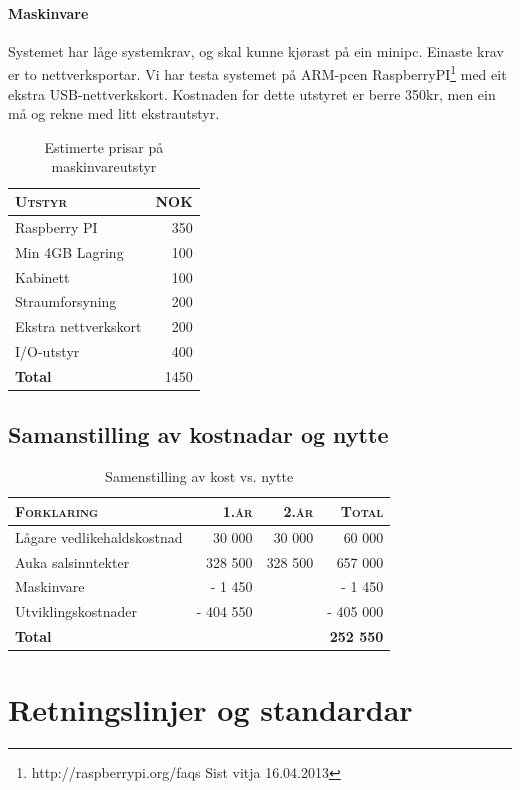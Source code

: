 \documentclass[nynorsk,12pt,a4paper]{article}
\begin{document}
\paragraph{Maskinvare}
Systemet har låge systemkrav, og skal kunne kjørast på ein minipc. Einaste krav er to nettverksportar. Vi har testa systemet på ARM-pcen RaspberryPI\footnote{ http://raspberrypi.org/faqs Sist vitja 16.04.2013} med eit ekstra USB-nettverkskort. Kostnaden for dette utstyret er berre 350kr, men ein må og rekne med litt ekstrautstyr.
\begin{table}[h!]
	\centering
	\begin{tabular}{l r}
	\textsc{Utstyr} & 	\textsc{NOK} \\ \hline
	Raspberry PI	& 	350 \\
	Min 4GB Lagring	&	100	\\
	Kabinett		&	100	\\
	Straumforsyning	&	200	\\
	Ekstra nettverkskort & 	200 \\
	I/O-utstyr		&	400	\\ \hline
	\textbf{Total}	&	1450 \\ \hline \hline
	\end{tabular}
	\caption{Estimerte prisar på maskinvareutstyr}
\end{table}


\subsection{Samanstilling av kostnadar og nytte}
\begin{table}[h!]
	\centering
	\begin{tabular}{l r r r}
	\textsc{Forklaring} & \textsc{1.år} & \textsc{2.år} & \textsc{Total} \\ \hline
	Lågare vedlikehaldskostnad & 30 000 & 30 000 & 60 000 \\
	Auka salsinntekter & 328 500 & 328 500 & 657 000 \\
	Maskinvare & - 1 450 & ~ & - 1 450 \\
	Utviklingskostnader & - 404 550 & ~ & - 405 000 \\ \hline
	\textbf{Total} & ~ & ~ & \textbf{252 550} \\ \hline \hline
	\end{tabular}
	\caption{Samenstilling av kost vs. nytte}
\end{table}
\newpage
\section{Retningslinjer og standardar}
\end{document}
